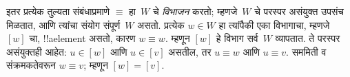 \documentclass[../../../include/open-logic-section]{subfiles}
\begin{document}
इतर प्रत्येक तुल्यता
संबंधाप्रमाणे $\equiv$
हा~$W$ चे \emph{विभाजन}
करतो; म्हणजे~$W$ चे
परस्पर असंयुक्त उपसंच
मिळतात, आणि त्यांचा
संयोग संपूर्ण~$W$ असतो.
प्रत्येक $w \in W$
हा त्यांपैकी एका
विभागाचा, म्हणजे~$[w]$
चा, !!a{element} असतो,
कारण $w \equiv w$.
म्हणून $[w]$ हे विभाग
सर्व~$W$ व्यापतात.
ते परस्पर असंयुक्तही
आहेत: $u \in [w]$
आणि $u \in [v]$
असतील, तर $u \equiv w$
आणि $u \equiv v$.
सममिती व संक्रमकतेवरून
$w \equiv v$; म्हणून
$[w] = [v]$.
\end{document}
